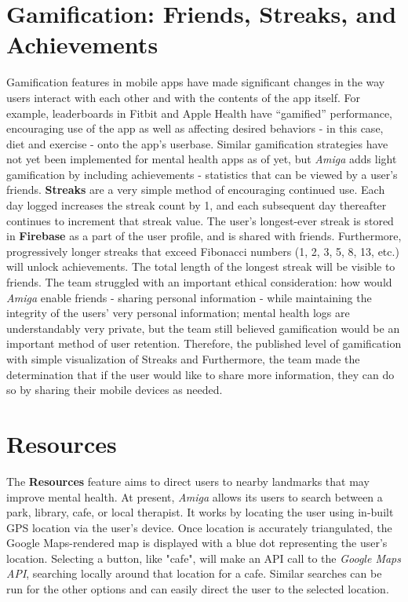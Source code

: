 \documentclass[10pt,american english]{article}
\begin{document}
\section*{Gamification: Friends, Streaks, and Achievements}
Gamification features in mobile apps have made significant changes in the way users interact with each other and with the contents of the app itself. For example, leaderboards in Fitbit and Apple Health have ``gamified'' performance, encouraging use of the app as well as affecting desired behaviors - in this case, diet and exercise - onto the app's userbase. Similar gamification strategies have not yet been implemented for mental health apps as of yet, but \textit{Amiga} adds light gamification by including achievements - statistics that can be viewed by a user's friends. 
\newline
\newline
\textbf{Streaks} are a very simple method of encouraging continued use. Each day logged increases the streak count by 1, and each subsequent day thereafter continues to increment that streak value. The user's longest-ever streak is stored in \textbf{Firebase} as a part of the user profile, and is shared with friends. Furthermore, progressively longer streaks that exceed Fibonacci numbers (1, 2, 3, 5, 8, 13, etc.) will unlock achievements. The total length of the longest streak will be visible to friends. 
\newline
\newline
The team struggled with an important ethical consideration: how would \textit{Amiga} enable friends - sharing personal information - while maintaining the integrity of the users' very personal information; mental health logs are understandably very private, but the team still believed gamification would be an important method of user retention. Therefore, the published level of gamification with simple visualization of Streaks and Furthermore, the team made the determination that if the user would like to share more information, they can do so by sharing their mobile devices as needed.

\section*{Resources}

The \textbf{Resources} feature aims to direct users to nearby landmarks that may improve mental health. At present, \textit{Amiga} allows its users to search between a park, library, cafe, or local therapist. It works by locating the user using in-built GPS location via the user's device. Once location is accurately triangulated, the Google Maps-rendered map is displayed with a blue dot representing the user's location. Selecting a button, like "cafe", will make an API call to the \textit{Google Maps API}, searching locally around that location for a cafe. Similar searches can be run for the other options and can easily direct the user to the selected location.
\end{document}

